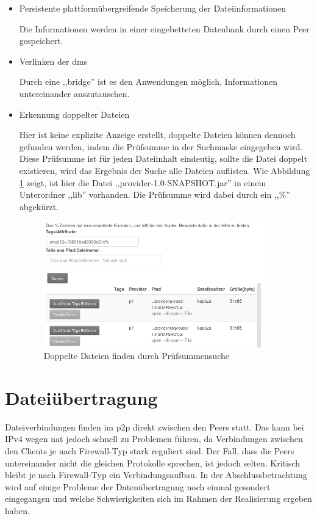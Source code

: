 \documentclass[oneside, ngerman, toc=bibliography,bibliography=totoc,listof=entryprefix, open=right,numbers=noenddot,fontsize=12pt]{scrbook}
\begin{document}
\begin{itemize}
         
      \item Persistente plattformübergreifende Speicherung der Dateiinformationen
      
      Die Informationen werden in einer eingebetteten Datenbank durch einen Peer gespeichert.
      
    \item Verlinken der \acrshort{dms}
    
    Durch eine ,,bridge'' ist es den Anwendungen möglich, Informationen untereinander auszutauschen. 
    
    \item Erkennung doppelter Dateien
    
    Hier ist keine explizite Anzeige erstellt, doppelte Dateien können dennoch gefunden werden, indem die Prüfsumme in der Suchmaske eingegeben wird. Diese Prüfsumme ist für jeden Dateiinhalt eindeutig, sollte die Datei doppelt existieren, wird das Ergebnis der Suche alle Dateien auflisten. Wie Abbildung \ref{fig:app-dups} zeigt, ist hier die Datei ,,provider-1.0-SNAPSHOT.jar'' in einem Unterordner ,,lib'' vorhanden. Die Prüfsumme wird dabei durch ein ,,\%'' abgekürzt.
    
    \begin{figure}[htbp] 
        \centering
        \includegraphics[width=0.9\textwidth]{Masterarbeit_Bilder/suchedups.png}
        \caption{Doppelte Dateien finden durch Prüfsummensuche}
        \label{fig:app-dups}
    \end{figure}  
    
    
    
\end{itemize}



\section{Dateiübertragung}
Dateiverbindungen finden im \acrshort{p2p} direkt zwischen den Peers statt.
Das kann bei IPv4 wegen \acrshort{nat} jedoch schnell zu Problemen führen, da Verbindungen zwischen den Clients je nach Firewall-Typ stark reguliert sind. Der Fall, dass die Peers untereinander nicht die gleichen Protokolle sprechen, ist jedoch selten. Kritisch bleibt je nach Firewall-Typ ein Verbindungsaufbau. In der Abschlussbetrachtung wird auf einige Probleme der Datenübertragung noch einmal gesondert eingegangen und welche Schwierigkeiten sich im Rahmen der Realisierung ergeben haben.
\end{document}
